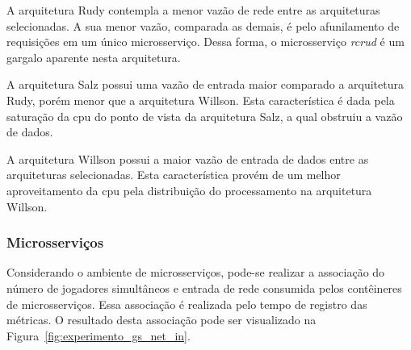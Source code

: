 A arquitetura Rudy contempla a menor vazão de rede entre as arquiteturas selecionadas.
%
A sua menor vazão, comparada as demais, é pelo afunilamento de requisições em um único microsserviço.
%
Dessa forma, o microsserviço \textit{rcrud} é um gargalo aparente nesta arquitetura.

A arquitetura Salz possui uma vazão de entrada maior comparado a arquitetura Rudy, porém menor que a arquitetura Willson.
%
Esta característica é dada pela saturação da \ac{cpu} do ponto de vista da arquitetura Salz, a qual obstruiu a vazão de dados.

A arquitetura Willson possui a maior vazão de entrada de dados entre as arquiteturas selecionadas.
%
Esta característica provém de um melhor aproveitamento da \ac{cpu} pela distribuição do processamento na arquitetura Willson.


\subsubsection{Microsserviços}

Considerando o ambiente de microsserviços, pode-se realizar a associação do número de jogadores simultâneos e entrada de rede consumida pelos contêineres de microsserviços.
%
Essa associação é realizada pelo tempo de registro das métricas.
%
O resultado desta associação pode ser visualizado na Figura~\ref{fig:experimento_gs_net_in}.

